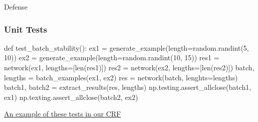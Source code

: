 \documentclass{beamer}
\begin{document}
\begin{section}{Defense}

\begin{frame}[fragile]
    \frametitle{Unit Tests}
    \begin{pythoncode}
def test_batch_stability():
    ex1 = generate_example(length=random.randint(5, 10))
    ex2 = generate_example(length=random.randint(10, 15))
    res1 = network(ex1, lengths=[len(res1)])
    res2 = network(ex2, lengths=[len(res2)])
    batch, lengths = batch_examples(ex1, ex2)
    res = network(batch, lenghts=lengths)
    batch1, batch2 = extract_results(res, lengths)
    np.testing.assert_allclose(batch1, ex1)
    np.texting.assert_allclose(batch2, ex2)
    \end{pythoncode}

    \href{https://github.com/dpressel/mead-baseline/blob/f98e64afcbab8a267fce5d13a434a981aa564d27/python/tests/test_crf_pytorch.py#L265}{An
    example of these tests in our CRF}

\end{frame}

\end{section}
\end{document}
